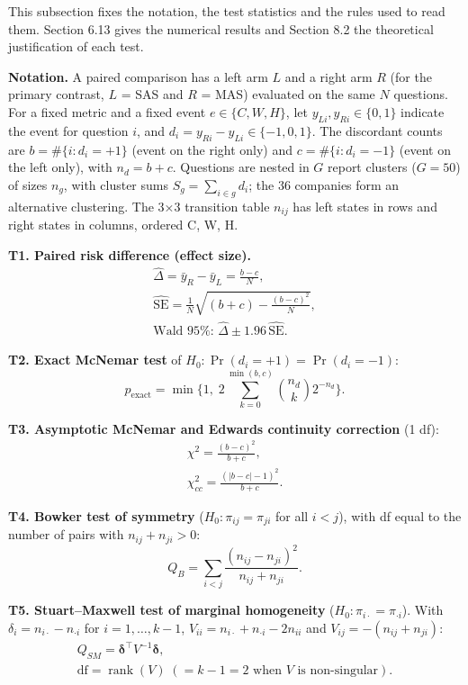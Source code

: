 \documentclass[letterpaper]{article}
\begin{document}
This subsection fixes the notation, the test statistics and the rules used to read them. Section 6.13 gives the numerical results and Section 8.2 the theoretical justification of each test.

\textbf{Notation.} A paired comparison has a left arm \(L\) and a right arm \(R\) (for the primary contrast, \(L\) = SAS and \(R\) = MAS) evaluated on the same \(N\) questions. For a fixed metric and a fixed event \(e\in\{C,W,H\}\), let \(y_{Li},y_{Ri}\in\{0,1\}\) indicate the event for question \(i\), and \(d_i=y_{Ri}-y_{Li}\in\{-1,0,1\}\). The discordant counts are \(b=\#\{i:d_i=+1\}\) (event on the right only) and \(c=\#\{i:d_i=-1\}\) (event on the left only), with \(n_d=b+c\). Questions are nested in \(G\) report clusters (\(G=50\)) of sizes \(n_g\), with cluster sums \(S_g=\sum_{i\in g}d_i\); the 36 companies form an alternative clustering. The 3×3 transition table \(n_{ij}\) has left states in rows and right states in columns, ordered C, W, H.

\textbf{T1. Paired risk difference (effect size).} \[\begin{gathered}\hat\Delta=\bar y_R-\bar y_L=\frac{b-c}{N},\\ \widehat{\mathrm{SE}}=\frac{1}{N}\sqrt{(b+c)-\frac{(b-c)^2}{N}},\\ \text{Wald 95\%: }\hat\Delta\pm1.96\,\widehat{\mathrm{SE}}.\end{gathered}\]

\textbf{T2. Exact McNemar test} of \(H_0:\Pr(d_i=+1)=\Pr(d_i=-1)\): \[p_{\text{exact}}=\min\Big\{1,\;2\sum_{k=0}^{\min(b,c)}\binom{n_d}{k}2^{-n_d}\Big\}.\]

\textbf{T3. Asymptotic McNemar and Edwards continuity correction} (1 df): \[\begin{gathered}\chi^2=\frac{(b-c)^2}{b+c},\\ \chi^2_{cc}=\frac{(\lvert b-c\rvert-1)^2}{b+c}.\end{gathered}\]

\textbf{T4. Bowker test of symmetry} (\(H_0:\pi_{ij}=\pi_{ji}\) for all \(i<j\)), with df equal to the number of pairs with \(n_{ij}+n_{ji}>0\): \[Q_B=\sum_{i<j}\frac{(n_{ij}-n_{ji})^2}{n_{ij}+n_{ji}}.\]

\textbf{T5. Stuart--Maxwell test of marginal homogeneity} (\(H_0:\pi_{i\cdot}=\pi_{\cdot i}\)). With \(\delta_i=n_{i\cdot}-n_{\cdot i}\) for \(i=1,\dots,k-1\), \(V_{ii}=n_{i\cdot}+n_{\cdot i}-2n_{ii}\) and \(V_{ij}=-(n_{ij}+n_{ji})\): \[\begin{gathered}Q_{SM}=\boldsymbol\delta^{\top}V^{-1}\boldsymbol\delta,\\ \text{df}=\operatorname{rank}(V)\;(=k-1=2\text{ when }V\text{ is non-singular}).\end{gathered}\]
\end{document}
